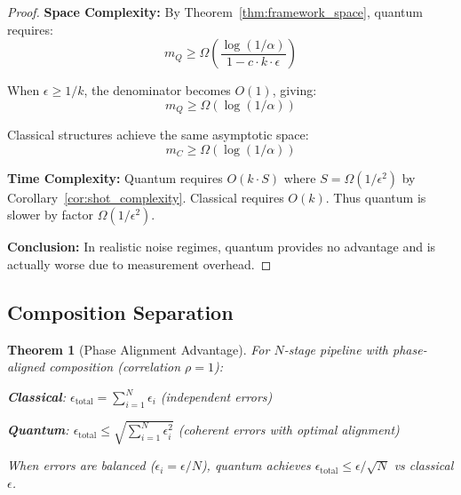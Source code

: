 \documentclass[11pt,letterpaper]{article}
\newtheorem{theorem}{Theorem}
\begin{document}
\begin{proof}
\textbf{Space Complexity:} By Theorem~\ref{thm:framework_space}, quantum requires:
\begin{equation}
m_Q \geq \Omega\left(\frac{\log(1/\alpha)}{1 - c \cdot k \cdot \epsilon}\right)
\end{equation}

When $\epsilon \geq 1/k$, the denominator becomes $O(1)$, giving:
\begin{equation}
m_Q \geq \Omega(\log(1/\alpha))
\end{equation}

Classical structures achieve the same asymptotic space:
\begin{equation}
m_C \geq \Omega(\log(1/\alpha))
\end{equation}

\textbf{Time Complexity:} Quantum requires $O(k \cdot S)$ where $S = \Omega(1/\epsilon^2)$ by Corollary~\ref{cor:shot_complexity}. Classical requires $O(k)$. Thus quantum is slower by factor $\Omega(1/\epsilon^2)$.

\textbf{Conclusion:} In realistic noise regimes, quantum provides no advantage and is actually worse due to measurement overhead.
\end{proof}

\subsection{Composition Separation}

\begin{theorem}[Phase Alignment Advantage]
\label{thm:phase_alignment}
For $N$-stage pipeline with phase-aligned composition (correlation $\rho = 1$):

\textbf{Classical}: $\epsilon_{\text{total}} = \sum_{i=1}^N \epsilon_i$ (independent errors)

\textbf{Quantum}: $\epsilon_{\text{total}} \leq \sqrt{\sum_{i=1}^N \epsilon_i^2}$ (coherent errors with optimal alignment)

When errors are balanced ($\epsilon_i = \epsilon/N$), quantum achieves $\epsilon_{\text{total}} \leq \epsilon/\sqrt{N}$ vs classical $\epsilon$.
\end{theorem}
\end{document}
